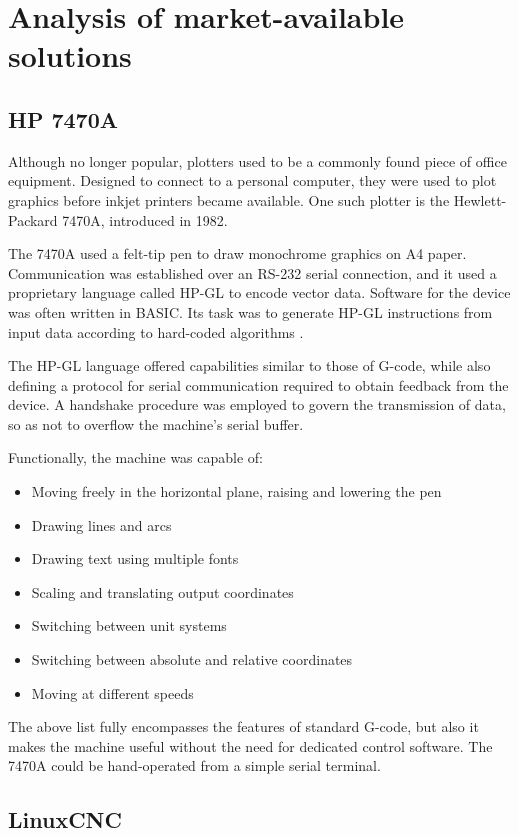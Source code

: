 \clearpage
\section{Analysis of market-available solutions}

\subsection{HP 7470A}

Although no longer popular, plotters used to be a commonly found piece of office
equipment. Designed to connect to a personal computer, they were used to plot
graphics before inkjet printers became available. One such plotter is the
Hewlett-Packard 7470A, introduced in 1982.

The 7470A used a felt-tip pen to draw monochrome graphics on A4 paper.
Communication was established over an RS-232 serial connection, and it used a
proprietary language called HP-GL to encode vector data. Software for the device
was often written in BASIC. Its task was to generate HP-GL instructions from
input data according to hard-coded algorithms \cite{7470a}.

The HP-GL language offered capabilities similar to those of G-code, while also
defining a protocol for serial communication required to obtain feedback from
the device. A handshake procedure was employed to govern the transmission of
data, so as not to overflow the machine's serial buffer.

Functionally, the machine was capable of:
\begin{itemize}
    \item Moving freely in the horizontal plane, raising and lowering the
    pen
    \item Drawing lines and arcs
    \item Drawing text using multiple fonts
    \item Scaling and translating output coordinates
    \item Switching between unit systems
    \item Switching between absolute and relative coordinates
    \item Moving at different speeds
\end{itemize}
The above list fully encompasses the features of standard G-code, but also it
makes the machine useful without the need for dedicated control software. The
7470A could be hand-operated from a simple serial terminal.

\subsection{LinuxCNC}

